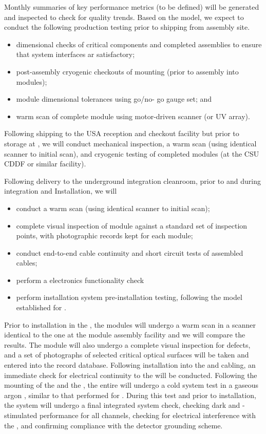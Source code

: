 Monthly summaries of key performance metrics (to be defined) will be
generated and inspected to check for quality trends. Based on the
 model, we expect to conduct the following production
testing prior to shipping from assembly site. 
\begin{itemize}
\item dimensional checks of
critical components and completed assemblies to ensure that
system interfaces ar satisfactory;
\item  post-assembly cryogenic checkouts of  mounting
 (prior to assembly into  modules);
\item module dimensional
tolerances using go/no- go gauge set; and 
\item warm scan of complete module
using motor-driven  scanner (or UV  array).  
\end{itemize}
Following shipping
to the USA reception and checkout facility but prior to storage at
, we will conduct mechanical inspection, a warm scan (using identical scanner to
initial scan), and cryogenic testing of completed modules (at the CSU CDDF or
similar facility).

Following delivery to the underground integration cleanroom, prior to and
during integration and Installation, we will 
\begin{itemize}
\item conduct  a warm scan (using identical
scanner to initial scan);
\item  complete visual inspection of module against
a standard set of inspection points, with photographic records kept
for each module;
\item conduct end-to-end cable continuity and short circuit tests
of assembled cables; 
\item perform a  electronics functionality
check  
\item perform installation   system pre-installation testing, following the model established for .
\end{itemize}


Prior to installation in the , the  modules will undergo a warm
scan in a scanner identical to the one at the  module assembly
facility and we will compare the results. The module will also 
undergo a complete visual inspection for defects, and a set of
photographs of selected critical optical surfaces will be taken and entered
into the  record database. Following installation into the  and
cabling, an immediate check for electrical continuity to the 
will be conducted. Following the mounting of the  
and the , the entire  will undergo a cold system
test in a gaseous argon \coldbox, similar to that performed for
. During this test and prior to installation, the  system 
will undergo a final
integrated system check, checking dark and
-stimulated  performance for all channels, checking for
electrical interference with the , and confirming
compliance with the detector grounding scheme.

